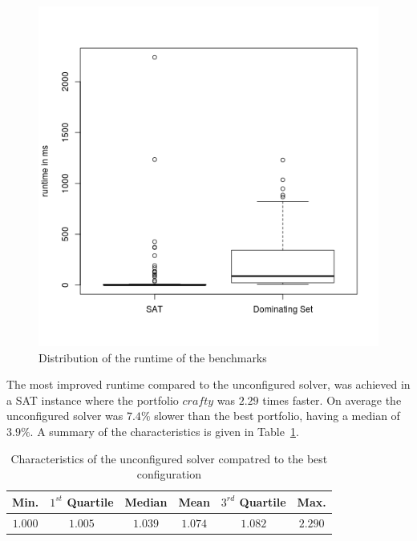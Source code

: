 \begin{figure}[h]
	\center
	\includegraphics[scale=\figscale]{figures/runtime.png}
	\caption{Distribution of the runtime of the benchmarks\label{fig:runtime}}
\end{figure}

The most improved runtime compared to the unconfigured solver, was achieved in a SAT instance where the portfolio \inline$crafty$ was $2.29$ times faster. On average the unconfigured solver was $7.4\%$ slower than the best portfolio, having a median of $3.9\%$. A summary of the characteristics is given in Table~\ref{tbl:charcmp}.

\begin{table}[h]
	\center
	\begin{tabular}{c|c|c|c|c|c}
		Min. & $1^{st}$ Quartile & Median & Mean & $3^{rd}$ Quartile & Max. \\
		\hline
		$1.000$&$1.005$&$1.039$&$1.074$&$1.082$ &$2.290$
	\end{tabular}
	\caption{Characteristics of the unconfigured solver compatred to the best configuration\label{tbl:charcmp}}
\end{table}

